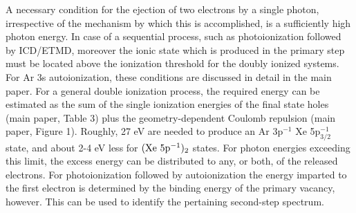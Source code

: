 \documentclass[journal=jpccck,manuscript=suppinfo]{achemso}
\begin{document}
A necessary condition for the ejection of two electrons by a single photon, irrespective of the mechanism by which this is accomplished, is a sufficiently high photon energy. 
In case of a sequential process, such as photoionization followed by ICD/ETMD, moreover the ionic state which is produced in the primary step must be located above the ionization threshold for the doubly ionized systems.
For Ar 3s autoionization, these conditions are discussed in detail in the main paper.
For a general double ionization process, the required energy can be estimated as the sum of the single ionization energies of the final state holes (main paper, Table 3) plus the geometry-dependent Coulomb repulsion (main paper, Figure 1).
Roughly, 27 eV are needed to produce an Ar 3p$^{-1}$ Xe 5p$_{3/2}^{-1}$ state, and about 2-4 eV less for $\rm (Xe\ 5p^{-1})_2$ states.
For photon energies exceeding this limit, the excess energy can be distributed to any, or both, of the released electrons.
For photoionization followed by autoionization the energy imparted to the first electron is determined by the binding energy of the primary vacancy, however.
This can be used to identify the pertaining second-step spectrum.
\end{document}
